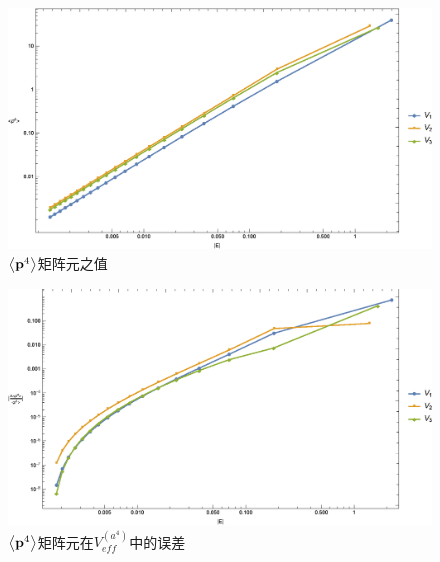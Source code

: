 \documentclass[cs4size,titlepage,twoside]{ctexart}
\begin{document}
\begin{figure}[!htbp]
	\centering
	\includegraphics[width=6in]{MultiplePotential_7.eps}
	\caption{$\expval{\vb{p}^4}$矩阵元之值}\label{MP5}
\end{figure}
\begin{figure}[!htbp]
	\centering
	\includegraphics[width=6in]{MultiplePotential_8.eps}
	\caption{$\expval{\vb{p}^4}$矩阵元在$V_{eff}^{(a^4)}$中的误差}\label{MP6}
\end{figure}
\end{document}

